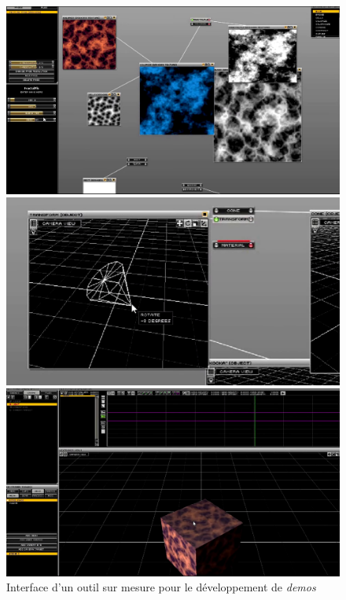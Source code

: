 \begin{figure}[h]
  \begin{minipage}[b]{0.30\linewidth}
    \centering
    \includegraphics[width=\linewidth]{images/demoscene/demos/devtool1.png}
  \end{minipage}
  \hfill
  \begin{minipage}[b]{0.30\linewidth}
    \centering
    \includegraphics[width=\linewidth]{images/demoscene/demos/devtool2.png}
  \end{minipage}
  \hfill
  \begin{minipage}[b]{0.30\linewidth}
    \centering
    \includegraphics[width=\linewidth]{images/demoscene/demos/devtool3.png}
  \end{minipage}
   \caption{Interface d'un outil sur mesure pour le développement de \textit{demos}}
  \label{devtool00}
\end{figure}


